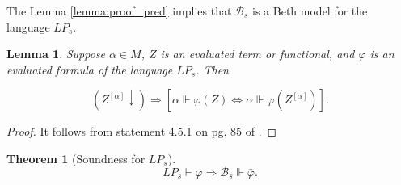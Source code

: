 \documentclass{asl}
\newtheorem{theorem}{Theorem}[section]
\newtheorem{lemma}{Lemma}[section]
\theoremstyle{definition}
\begin{document}
The Lemma \ref{lemma:proof_pred} implies that $\mathcal{B}_s$ is a Beth model for the language $LP_s$.

\begin{lemma} 
Suppose $ \alpha\in M $, $ Z $ is an evaluated term or functional, and $ \varphi $ is an evaluated formula of the language $ LP_{s} $. Then 

\[ \left(Z^{[\alpha]}\downarrow\right)  \Rightarrow  \left[\alpha \Vdash \varphi(Z) \Leftrightarrow \alpha \Vdash \varphi(Z^{[\alpha]}) \right]. \]
 \label{lemma:sub_in_forcing} 
\end{lemma} 
\begin{proof} 
It follows from statement 4.5.1 on pg. 85 of \cite{drag87}.
\end{proof} 

\begin{theorem}[Soundness for $ LP_s $]
\[ LP_s\vdash\varphi\Rightarrow  \mathcal{B}_s \Vdash\bar{\varphi}. \]
\label{theorem:soundness}
\end{theorem}
\end{document}
